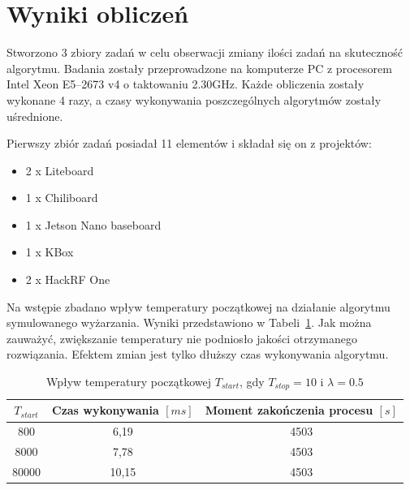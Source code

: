 \section{Wyniki obliczeń}
Stworzono 3 zbiory zadań w celu obserwacji zmiany ilości zadań na skuteczność algorytmu.
Badania zostały przeprowadzone na komputerze PC z procesorem Intel Xeon E5--2673 v4 o taktowaniu 2.30GHz.
Każde obliczenia zostały wykonane 4 razy, a czasy wykonywania poszczególnych algorytmów zostały uśrednione.

\newpage{}
\breakparagraph{}
Pierwszy zbiór zadań posiadał 11 elementów i składał się on z projektów:
\begin{itemize}
	\item 2 x Liteboard
	\item 1 x Chiliboard
	\item 1 x Jetson Nano baseboard
	\item 1 x KBox
	\item 2 x HackRF One
\end{itemize}

Na wstępie zbadano wpływ temperatury początkowej na działanie algorytmu symulowanego wyżarzania. Wyniki przedstawiono w Tabeli~\ref{tstart_sa}. Jak można zauważyć, zwiększanie temperatury nie podniosło jakości otrzymanego rozwiązania. Efektem zmian jest tylko dłuższy czas wykonywania algorytmu.

\begin{table}[H]
	\centering
	\label{tstart_sa}
	\caption{Wpływ temperatury początkowej $T_{start}$, gdy $T_{stop}=10$ i $\lambda=0.5$}
	\begin{tabular}{ccc}
		\toprule
		$T_{start}$ & Czas wykonywania $[ms]$ & Moment zakończenia procesu $[s]$ \\
		\midrule
		800         & 6,19                    & 4503                              \\
		8000        & 7,78                    & 4503                              \\
		80000       & 10,15                   & 4503                              \\
		\bottomrule
	\end{tabular}
\end{table}

